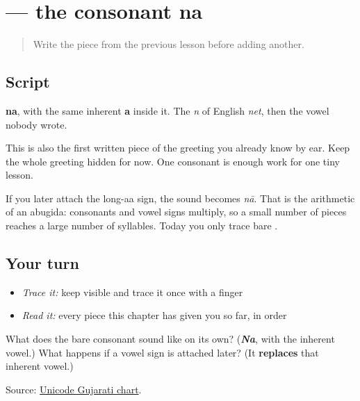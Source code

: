 \section[na]{ — the consonant na}

\label{lesson:GU-W01-na}



\begin{quote}
Write the piece from the previous lesson before adding another.
\end{quote}

\subsection*{Script}
\begin{quote}
\end{quote}

\textbf{na}, with the same inherent \textbf{a} inside it. The \emph{n} of English \emph{net}, then the vowel nobody wrote.

This is also the first written piece of the greeting you already know by ear. Keep the whole greeting hidden for now. One consonant is enough work for one tiny lesson.

If you later attach the long-aa sign, the sound becomes \emph{nā}. That is the arithmetic of an abugida: consonants and vowel signs multiply, so a small number of pieces reaches a large number of syllables. Today you only trace bare \textbf{}.

\subsection*{Your turn}
\begin{itemize}
\raggedright
  \item \emph{Trace it:} keep  visible and trace it once with a finger
  \item \emph{Read it:} every piece this chapter has given you so far, in order
\end{itemize}

\begin{tcolorbox}[breakable,colback=teal!4,colframe=teal!35!black,title={Before you move on}]
What does the bare consonant sound like on its own? (\emph{\textbf{Na}}, with the inherent vowel.) What happens if a vowel sign is attached later? (It \textbf{replaces} that inherent vowel.)

Source: \href{https://www.unicode.org/charts/PDF/U0A80.pdf}{Unicode Gujarati chart}.
\end{tcolorbox}
